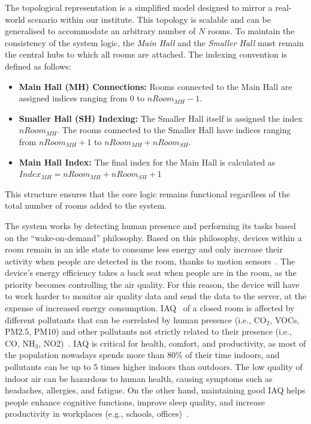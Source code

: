 \documentclass[runningheads]{llncs}
\begin{document}
The topological representation is a simplified model designed to mirror a real-world scenario within our institute. This topology is scalable and can be generalised to accommodate an arbitrary number of $N$ rooms. 
%
To maintain the consistency of the system logic, the \textit{Main Hall} and the \textit{Smaller Hall} must remain the central hubs to which all rooms are attached. The indexing convention is defined as follows:
%
\begin{itemize}
    \item \textbf{Main Hall (MH) Connections:} Rooms connected to the Main Hall are assigned indices ranging from $0$ to $nRoom_{MH} - 1$.
    \item \textbf{Smaller Hall (SH) Indexing:} The Smaller Hall itself is assigned the index $nRoom_{MH}$. The rooms connected to the Smaller Hall have indices ranging from $nRoom_{MH} + 1$ to $nRoom_{MH} + nRoom_{SH}$.
    \item \textbf{Main Hall Index:} The final index for the Main Hall is calculated as $Index_{MH} = nRoom_{MH} + nRoom_{SH} + 1$
\end{itemize}
%
This structure ensures that the core logic remains functional regardless of the total number of rooms added to the system.

%
The system works by detecting human presence and performing its tasks based on the “wake-on-demand” philosophy. Based on this philosophy, devices within a room remain in an idle state to consume less energy and only increase their activity when people are detected in the room, thanks to motion sensors~\cite{s24072123,jpmcj2019101037}. 
%
The device's energy efficiency takes a back seat when people are in the room, as the priority becomes controlling the air quality. For this reason, the device will have to work harder to monitor air quality data and send the data to the server, at the expense of increased energy consumption.
%
IAQ~\cite{s24216850} of a closed room is affected by different pollutants that can be correlated by human presence (i.e., CO$_2$, VOCs, PM2.5, PM10) and other pollutants not strictly related to their presence (i.e., CO, NH$_3$, NO2)~\cite{DasIN25,PREK2017228}. 
%
IAQ is critical for health, comfort, and productivity, as most of the population nowadays spends more than 80\% of their time indoors, and pollutants can be up to 5 times higher indoors than outdoors.
%
The low quality of indoor air can be hazardous to human health, causing symptoms such as headaches, allergies, and fatigue. 
%
On the other hand, maintaining good IAQ helps people enhance cognitive functions, improve sleep quality, and increase productivity in workplaces (e.g., schools, offices)~\cite{DasIN25}.
\end{document}
